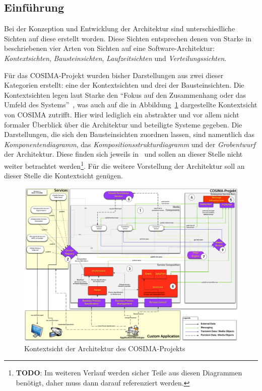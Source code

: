 \subsection{Einführung} %
\label{sub:einfuehrung}

  Bei der Konzeption und Entwicklung der Architektur sind unterschiedliche Sichten auf diese erstellt worden. Diese Sichten entsprechen denen von Starke in~\citep[S. 83]{effektive_software_architekturen} beschriebenen vier Arten von Sichten auf eine Software-Architektur: \emph{Kontextsichten}, \emph{Bausteinsichten}, \emph{Laufzeitsichten} und \emph{Verteilungssichten}.

  Für das COSIMA-Projekt wurden bisher Darstellungen aus zwei dieser Kategorien erstellt: eine der Kontextsichten und drei der Bausteinsichten. Die Kontextsichten legen laut Starke den "`Fokus auf den Zusammenhang oder das Umfeld des Systems"'~\citep[S. 87]{effektive_software_architekturen}, was auch auf die in Abbildung~\ref{fig:Kontextsicht_Architektur_COSIMA} dargestellte Kontextsicht von COSIMA zutrifft. Hier wird lediglich ein abstrakter und vor allem nicht formaler Überblick über die Architektur und beteiligte Systeme gegeben. Die Darstellungen, die sich den Bausteinsichten zuordnen lassen, sind namentlich das \emph{Komponentendiagramm}, das \emph{Kompositionsstrukturdiagramm} und der \emph{Grobentwurf} der Architektur. Diese finden sich jeweils in~\citep{bericht} und sollen an dieser Stelle nicht weiter betrachtet werden\footnote{\textbf{TODO}: Im weiteren Verlauf werden sicher Teile aus diesen Diagrammen benötigt, daher muss dann darauf referenziert werden.}. Für die weitere Vorstellung der Architektur soll an dieser Stelle die Kontextsicht genügen.

\begin{figure}[ht]
  \centering
    \includegraphics[width=.9\textwidth]{images/Kontextsicht_Architektur_COSIMA}
  \caption{Kontextsicht der Architektur des COSIMA-Projekts}
  \label{fig:Kontextsicht_Architektur_COSIMA}
\end{figure}

